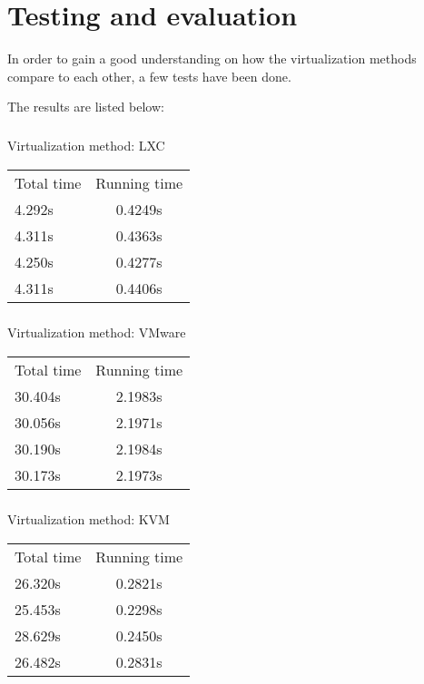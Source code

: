 \chapter{Testing and evaluation}
\label{chapter:virt-testing}

In order to gain a good understanding on how the virtualization methods
compare to each other, a few tests have been done.

The results are listed below:

\paragraph {}

Virtualization method: LXC
\begin{center}
\begin{tabular}{ l | c }
Total time & Running time \\
4.292s & 0.4249s  \\
4.311s & 0.4363s  \\
4.250s & 0.4277s  \\
4.311s & 0.4406s  \\
\end{tabular}
\end{center}
\paragraph {}


Virtualization method: VMware
\begin{center}
\begin{tabular}{ l | c }
Total time & Running time \\
30.404s & 2.1983s  \\
30.056s & 2.1971s  \\
30.190s & 2.1984s  \\
30.173s & 2.1973s  \\
\end{tabular}
\end{center}
\paragraph {}

Virtualization method: KVM
\begin{center}
\begin{tabular}{ l | c }
Total time & Running time \\
26.320s & 0.2821s  \\
25.453s & 0.2298s  \\
28.629s & 0.2450s  \\
26.482s & 0.2831s  \\
\end{tabular}
\end{center}


